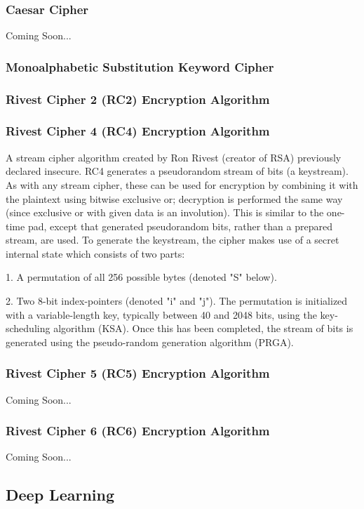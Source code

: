 \documentclass[12pt, letterpaper]{article}
\begin{document}
\begin{sloppypar}
\begin{flushleft}
\subsubsection{Caesar Cipher}
Coming Soon...

\subsubsection{Monoalphabetic Substitution Keyword Cipher}
\subsubsection{Rivest Cipher 2 (RC2) Encryption Algorithm}
\subsubsection{Rivest Cipher 4 (RC4) Encryption Algorithm}
A stream cipher algorithm created by Ron Rivest (creator of RSA) previously declared 
insecure. RC4 generates a pseudorandom stream of bits (a keystream). As with any stream 
cipher, these can be used for encryption by combining it with the plaintext using bitwise 
exclusive or; decryption is performed the same way (since exclusive or with given data is 
an involution). This is similar to the one-time pad, except that generated pseudorandom 
bits, rather than a prepared stream, are used. To generate the keystream, the cipher makes 
use of a secret internal state which consists of two parts:

\item 1. A permutation of all 256 possible bytes (denoted "S" below).
\item 2. Two 8-bit index-pointers (denoted "i" and "j").
The permutation is initialized with a variable-length key, typically between 40 and 2048 
bits, using the key-scheduling algorithm (KSA). Once this has been completed, the stream 
of bits is generated using the pseudo-random generation algorithm (PRGA).

\subsubsection{Rivest Cipher 5 (RC5) Encryption Algorithm}
Coming Soon...

\subsubsection{Rivest Cipher 6 (RC6) Encryption Algorithm}
Coming Soon...

\subsection{Deep Learning}

\end{flushleft}
\end{sloppypar}
\end{document}
